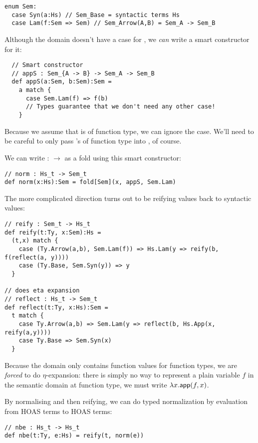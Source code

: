 \begin{lstlisting}
enum Sem:
  case Syn(a:Hs) // Sem_Base = syntactic terms Hs
  case Lam(f:Sem => Sem) // Sem_Arrow(A,B) = Sem_A -> Sem_B
\end{lstlisting}

Although the  domain doesn't have a case for , we \emph{can} write a smart constructor for it:

\begin{lstlisting}
  // Smart constructor
  // appS : Sem_{A -> B} -> Sem_A -> Sem_B
  def appS(a:Sem, b:Sem):Sem =
    a match {
      case Sem.Lam(f) => f(b)
      // Types guarantee that we don't need any other case!
    }
\end{lstlisting}

Because we assume that  is of function type, we can ignore the  case.
We'll need to be careful to only pass 's of function type into , of course.

We can write  :  $\to$  as a fold using this smart constructor:

\begin{lstlisting}
// norm : Hs_t -> Sem_t
def norm(x:Hs):Sem = fold[Sem](x, appS, Sem.Lam)
\end{lstlisting}

The more complicated direction turns out to be reifying  values back to syntactic  values:

\begin{lstlisting}
// reify : Sem_t -> Hs_t
def reify(t:Ty, x:Sem):Hs =
  (t,x) match {
    case (Ty.Arrow(a,b), Sem.Lam(f)) => Hs.Lam(y => reify(b, f(reflect(a, y))))
    case (Ty.Base, Sem.Syn(y)) => y
  }

// does eta expansion
// reflect : Hs_t -> Sem_t
def reflect(t:Ty, x:Hs):Sem =
  t match {
    case Ty.Arrow(a,b) => Sem.Lam(y => reflect(b, Hs.App(x, reify(a,y))))
    case Ty.Base => Sem.Syn(x)
  }
\end{lstlisting}

Because the  domain only contains function values for function types, we are \emph{forced} to do $\eta$-expansion:
there is simply no way to represent a plain variable $f$ in the semantic domain at function type, we must write $\lambda x. \mathsf{app}(f,x)$.

By normalising and then reifying, we can do typed normalization by evaluation from HOAS terms to HOAS terms:

\begin{lstlisting}
// nbe : Hs_t -> Hs_t
def nbe(t:Ty, e:Hs) = reify(t, norm(e))
\end{lstlisting}

